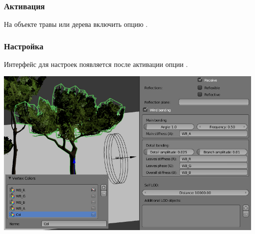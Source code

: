 \documentclass[a4paper,12pt,oneside]{sphinxmanual}
\begin{document}
\subsubsection{Активация}
\label{outdoor_rendering:id34}
На объекте травы или дерева включить опцию .


\subsubsection{Настройка}
\label{outdoor_rendering:id35}
Интерфейс для настроек появляется после активации опции .

{\hfill\includegraphics[width=1.000\linewidth]{wind_bending_setup.jpg}\hfill}
\end{document}
